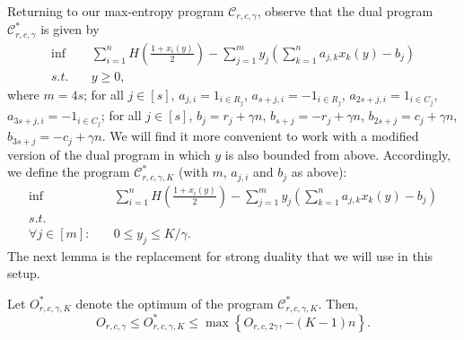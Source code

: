 \documentclass[final, 12pt]{colt2018}
\theoremstyle{definition}
\theoremstyle{plain}
\begin{document}
Returning to our max-entropy program $\mathcal{C}_{r,c,\gamma}$, observe that the dual program $\mathcal{C}^{*}_{r,c,\gamma}$ is given by
\begin{align*}
\inf & \quad \sum_{i=1}^{n}H\left(\frac{1+x_i(y)}{2}\right)-\sum_{j=1}^{m}y_{j}\left(\sum_{k=1}^{n}a_{j,k}x_k(y)-b_{j}\right)\\
s.t.&\quad y\geq0,
\end{align*}
where $m=4s$; %
for all $j\in [s]$, $a_{j,i}=1_{i\in R_{j}}$,
$a_{s+j,i}=-1_{i\in R_{j}}$, $a_{2s+j,i}=1_{i\in C_{j}}$, $a_{3s+j,i}=-1_{i\in C_{j}}$; for all $j\in [s]$, $b_{j}=r_{j}+\gamma n$, $b_{s+j}=-r_j + \gamma n$, $b_{2s+j}= c_j +\gamma n$, $b_{3s+j} = -c_j+\gamma n$. We will find it more convenient to work with a modified version of the dual program in which $y$ is also bounded from above. Accordingly, we define the program $\mathcal{C}^{*}_{r,c,\gamma,K}$ (with $m$, $a_{j,i}$ and $b_j$ as above): 
\begin{align*}
\inf & \quad \sum_{i=1}^{n}H\left(\frac{1+x_i(y)}{2}\right)-\sum_{j=1}^{m}y_{j}\left(\sum_{k=1}^{n}a_{j,k}x_k(y)-b_{j}\right)\\
s.t.\\
\forall j \in [m]: &\quad 0\leq y_j \leq K/\gamma.
\end{align*}
The next lemma is the replacement for strong duality that we will use in this setup. 
\begin{lemma}
\label{lemma:modified-strong-duality}
Let $O^{*}_{r,c,\gamma,K}$ denote the optimum of the program $\mathcal{C}^{*}_{r,c,\gamma,K}$. Then, $$O_{r,c,\gamma} \leq O^{*}_{r,c,\gamma, K} \leq \max\left\{O_{r,c,2\gamma},-(K-1)n\right\}.$$
\end{lemma}
\end{document}
